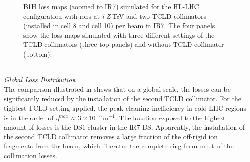 \begin{figure}[t]
  \centering
  \caption{B1H loss maps (zoomed to IR7) simulated for the HL-LHC configuration with \lead ions at 7$\,Z\,$TeV and two TCLD collimators (installed in cell 8 and cell 10) per beam in IR7. The four panels show the loss maps simulated with three different settings of the TCLD collimators (three top panels) and without TCLD collimator (bottom).}  
  \label{pic:16081602}
  \end{figure}





%
%


\mbox{} \\ 
\textit{Global Loss Distribution} \\
The comparison illustrated in  shows that on a global scale, the losses can be significantly reduced by the installation of the second TCLD collimator. For the tightest TCLD setting applied, the peak cleaning inefficiency in cold LHC regions is in the order of $\eta^{max}\approx 3 \times 10^{-5}$\,m$^{-1}$. The location exposed to the highest amount of losses is the DS1 cluster in the IR7 DS. Apparently, the installation of the second TCLD collimator removes a large fraction of the off-rigid ion fragments from the beam, which liberates the complete ring from most of the collimation losses. 




